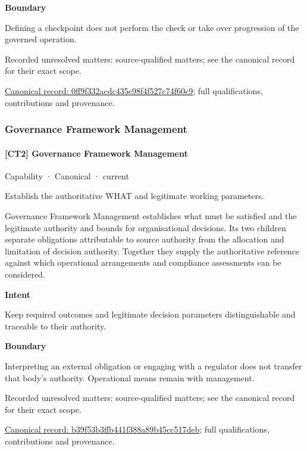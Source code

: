 \textbf{Boundary}



Defining a checkpoint does not perform the check or take over progression of the governed operation.


{\small Recorded unresolved matters: source-qualified matters; see the canonical record for their exact scope.}\par
{\footnotesize \href{../../../../continuum/strategy/capability/0ff9f332acdc435e98f4f527c74f60c9.md}{Canonical record: 0ff9f332acdc435e98f4f527c74f60c9}; full qualifications, contributions and provenance.}\par
\subsubsection{Governance Framework Management}

\paragraph{[CT2] Governance Framework Management}

\label{element:b39f53b3ffb441f388a89b45cc517deb}
{\small Capability · Canonical · current}\par

Establish the authoritative WHAT and legitimate working parameters.



Governance Framework Management establishes what must be satisfied and the legitimate authority and bounds for organisational decisions. Its two children separate obligations attributable to source authority from the allocation and limitation of decision authority. Together they supply the authoritative reference against which operational arrangements and compliance assessments can be considered.



\textbf{Intent}



Keep required outcomes and legitimate decision parameters distinguishable and traceable to their authority.



\textbf{Boundary}



Interpreting an external obligation or engaging with a regulator does not transfer that body's authority. Operational means remain with management.


{\small Recorded unresolved matters: source-qualified matters; see the canonical record for their exact scope.}\par
{\footnotesize \href{../../../../continuum/strategy/capability/b39f53b3ffb441f388a89b45cc517deb.md}{Canonical record: b39f53b3ffb441f388a89b45cc517deb}; full qualifications, contributions and provenance.}\par
